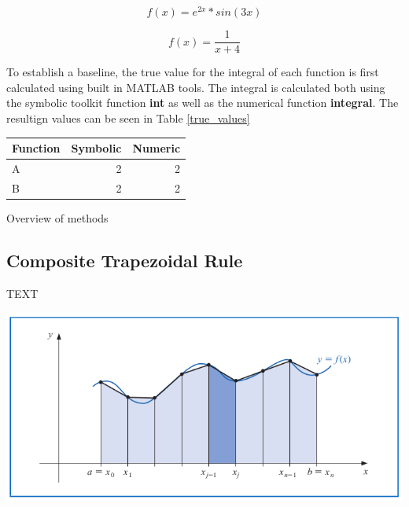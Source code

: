 \documentclass[a4paper]{article}
\begin{document}
\begin{equation}
f(x) = e^{2x} * sin(3x)
\label{eq:fa}
\end{equation}

\begin{equation}
f(x) = \frac{1}{x+4}
\label{eq:fb}
\end{equation}


To establish a baseline, the true value for the integral of each function is first calculated using built in MATLAB tools. The integral is calculated both using the symbolic toolkit function \textbf{int} as well as the numerical function \textbf{integral}. The resultign values can be seen in Table \ref{true_values}


\bgroup
\def\arraystretch{1.5}
\begin{center}
	\centering
	\begin{tabular}{l|r|r}
	\textbf{Function} & \textbf{Symbolic} & \textbf{Numeric} \\
	\hline
	A & 2 & 2\\
	B & 2 & 2
	\end{tabular}
	\label{true_values}
\end{center}
\egroup




Overview of methods



\subsection{Composite Trapezoidal Rule}
TEXT

\begin{center}
	\includegraphics[width=1\textwidth]{../additional/trapezoidal_fig.png}
	\label{trap_fig}
\end{center}
\end{document}
